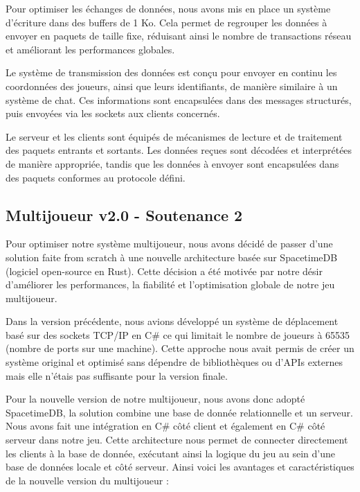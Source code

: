 \documentclass[
	article,			%
	11pt,				%
	oneside,			%
	a4paper,			%
	chapter=TITLE,
	french,			%
	sumario=tradicional
	]{base_nt}
\begin{document}
Pour optimiser les échanges de données, nous avons mis en place un système d'écriture dans des buffers de 1 Ko. Cela permet de regrouper les données à envoyer en paquets de taille fixe, réduisant ainsi le nombre de transactions réseau et améliorant les performances globales.

Le système de transmission des données est conçu pour envoyer en continu les coordonnées des joueurs, ainsi que leurs identifiants, de manière similaire à un système de chat. Ces informations sont encapsulées dans des messages structurés, puis envoyées via les sockets aux clients concernés.

Le serveur et les clients sont équipés de mécanismes de lecture et de traitement des paquets entrants et sortants. Les données reçues sont décodées et interprétées de manière appropriée, tandis que les données à envoyer sont encapsulées dans des paquets conformes au protocole défini.

\newpage

\subsection{Multijoueur v2.0 - Soutenance 2}

Pour optimiser notre système multijoueur, nous avons décidé de passer d'une solution faite from scratch à une nouvelle architecture basée sur SpacetimeDB (logiciel open-source en Rust). Cette décision a été motivée par notre désir d'améliorer les performances, la fiabilité et l'optimisation globale de notre jeu multijoueur.

Dans la version précédente, nous avions développé un système de déplacement basé sur des sockets TCP/IP en C\# ce qui limitait le nombre de joueurs à 65535 (nombre de ports sur une machine). Cette approche nous avait permis de créer un système original et optimisé sans dépendre de bibliothèques ou d'APIs externes mais elle n'étais pas suffisante pour la version finale.

Pour la nouvelle version de notre multijoueur, nous avons donc adopté SpacetimeDB, la solution combine une base de donnée relationnelle et un serveur. Nous avons fait une intégration en C\# côté client et également en C\# côté serveur dans notre jeu. Cette architecture nous permet de connecter directement les clients à la base de donnée, exécutant ainsi la logique du jeu au sein d'une base de données locale et côté serveur. Ainsi voici les avantages et caractéristiques de la nouvelle version du multijoueur :
\end{document}
